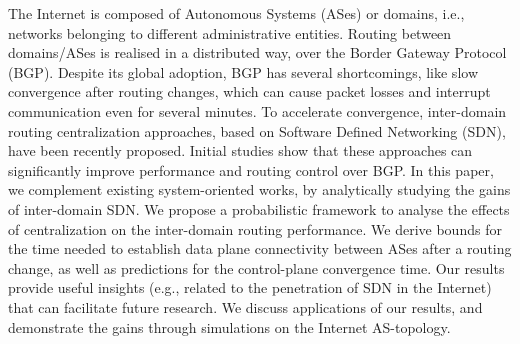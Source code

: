 The Internet is composed of Autonomous Systems (ASes) or domains, i.e., networks belonging to different administrative entities. Routing between domains/ASes is realised in a distributed way, over the Border Gateway Protocol (BGP). Despite its global adoption, BGP has several shortcomings, like slow convergence after routing changes, which can cause packet losses and interrupt communication even for several minutes. To accelerate convergence, inter-domain routing centralization approaches, based on Software Defined Networking (SDN), have been recently proposed. Initial studies show that these approaches can significantly improve performance and routing control over BGP. In this paper, we complement existing system-oriented works, by analytically studying the gains of inter-domain SDN. We propose a probabilistic framework to analyse the effects of centralization on the inter-domain routing performance. We derive bounds for the time needed to establish data plane connectivity between ASes after a routing change, as well as predictions for the control-plane convergence time. Our results provide useful insights (e.g., related to the penetration of SDN in the Internet) that can facilitate future research. We discuss applications of our results, and demonstrate the gains through simulations on the Internet AS-topology.

